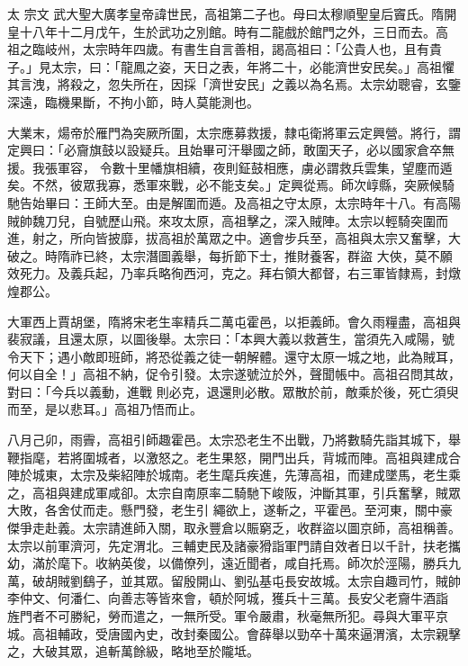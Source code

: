 
\begin{pinyinscope}

 太
 宗文
 武大聖大廣孝皇帝諱世民，高祖第二子也。母曰太穆順聖皇后竇氏。隋開皇十八年十二月戊午，生於武功之別館。時有二龍戲於館門之外，三日而去。高
 祖之臨岐州，太宗時年四歲。有書生自言善相，謁高祖曰：「公貴人也，且有貴子。」見太宗，曰：「龍鳳之姿，天日之表，年將二十，必能濟世安民矣。」高祖懼其言洩，將殺之，忽失所在，因採「濟世安民」之義以為名焉。太宗幼聰睿，玄鑒深遠，臨機果斷，不拘小節，時人莫能測也。



 大業末，煬帝於雁門為突厥所圍，太宗應募救援，隸屯衛將軍云定興營。將行，謂定興曰：「必齎旗鼓以設疑兵。且始畢可汗舉國之師，敢圍天子，必以國家倉卒無援。我張軍容，
 令數十里幡旗相續，夜則鉦鼓相應，虜必謂救兵雲集，望塵而遁矣。不然，彼眾我寡，悉軍來戰，必不能支矣。」定興從焉。師次崞縣，突厥候騎馳告始畢曰：王師大至。由是解圍而遁。及高祖之守太原，太宗時年十八。有高陽賊帥魏刀兒，自號歷山飛。來攻太原，高祖擊之，深入賊陣。太宗以輕騎突圍而進，射之，所向皆披靡，拔高祖於萬眾之中。適會步兵至，高祖與太宗又奮擊，大破之。時隋祚已終，太宗潛圖義舉，每折節下士，推財養客，群盜
 大俠，莫不願效死力。及義兵起，乃率兵略徇西河，克之。拜右領大都督，右三軍皆隸焉，封燉煌郡公。



 大軍西上賈胡堡，隋將宋老生率精兵二萬屯霍邑，以拒義師。會久雨糧盡，高祖與裴寂議，且還太原，以圖後舉。太宗曰：「本興大義以救蒼生，當須先入咸陽，號令天下；遇小敵即班師，將恐從義之徒一朝解體。還守太原一城之地，此為賊耳，何以自全！」高祖不納，促令引發。太宗遂號泣於外，聲聞帳中。高祖召問其故，對曰：「今兵以義動，進戰
 則必克，退還則必散。眾散於前，敵乘於後，死亡須臾而至，是以悲耳。」高祖乃悟而止。



 八月己卯，雨霽，高祖引師趣霍邑。太宗恐老生不出戰，乃將數騎先詣其城下，舉鞭指麾，若將圍城者，以激怒之。老生果怒，開門出兵，背城而陣。高祖與建成合陣於城東，太宗及柴紹陣於城南。老生麾兵疾進，先薄高祖，而建成墜馬，老生乘之，高祖與建成軍咸卻。太宗自南原率二騎馳下峻阪，沖斷其軍，引兵奮擊，賊眾大敗，各舍仗而走。懸門發，老生引
 繩欲上，遂斬之，平霍邑。至河東，關中豪傑爭走赴義。太宗請進師入關，取永豐倉以賑窮乏，收群盜以圖京師，高祖稱善。太宗以前軍濟河，先定渭北。三輔吏民及諸豪猾詣軍門請自效者日以千計，扶老攜幼，滿於麾下。收納英俊，以備僚列，遠近聞者，咸自托焉。師次於涇陽，勝兵九萬，破胡賊劉鷂子，並其眾。留殷開山、劉弘基屯長安故城。太宗自趣司竹，賊帥李仲文、何潘仁、向善志等皆來會，頓於阿城，獲兵十三萬。長安父老齎牛酒詣
 旌門者不可勝紀，勞而遣之，一無所受。軍令嚴肅，秋毫無所犯。尋與大軍平京城。高祖輔政，受唐國內史，改封秦國公。會薛舉以勁卒十萬來逼渭濱，太宗親擊之，大破其眾，追斬萬餘級，略地至於隴坻。




\end{pinyinscope}

